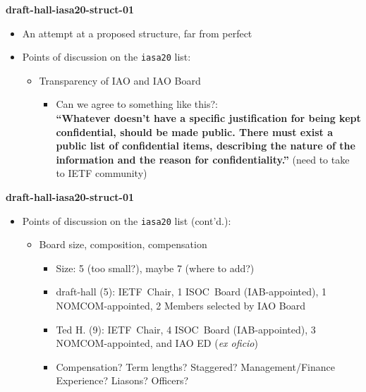 \documentclass[helvetica]{seminar}
\newcommand{\heading}[1]{%
  \begin{center} 
    \large\bf 
    #1 
  \end{center} 
  \vspace{.4 in}}
\begin{document}
\begin{slide}

\heading{draft-hall-iasa20-struct-01}

\begin{itemize}
\item An attempt at a proposed structure, far from perfect
\item Points of discussion on the \texttt{iasa20} list:
  \begin{itemize}
  \item Transparency of IAO and IAO Board
    \begin{itemize}
    \item Can we agree to something like this?:\\\textbf{``Whatever
      doesn't have a specific justification for being kept
      confidential, should be made public.  There must exist a public
      list of confidential items, describing the nature of the
      information and the reason for confidentiality.''} (need to take
      to IETF community)
    \end{itemize}
  \end{itemize}
\end{itemize}

\end{slide}



\begin{slide}

\heading{draft-hall-iasa20-struct-01}

\begin{itemize}
\item Points of discussion on the \texttt{iasa20} list (cont'd.):
  \begin{itemize}
  \item Board size, composition, compensation
    \begin{itemize}
    \item Size: 5 (too small?), maybe 7 (where to add?)
    \item draft-hall (5): IETF~Chair, 1 ISOC~Board (IAB-appointed), 1
      NOMCOM-appointed, 2 Members selected by IAO Board
    \item Ted H. (9): IETF~Chair, 4 ISOC~Board (IAB-appointed), 3
      NOMCOM-appointed, and IAO ED (\textit{ex oficio})
    \item Compensation? Term lengths? Staggered? Management/Finance
      Experience? Liasons? Officers?
    \end{itemize}
  \end{itemize}
\end{itemize}

\end{slide}
\end{document}
